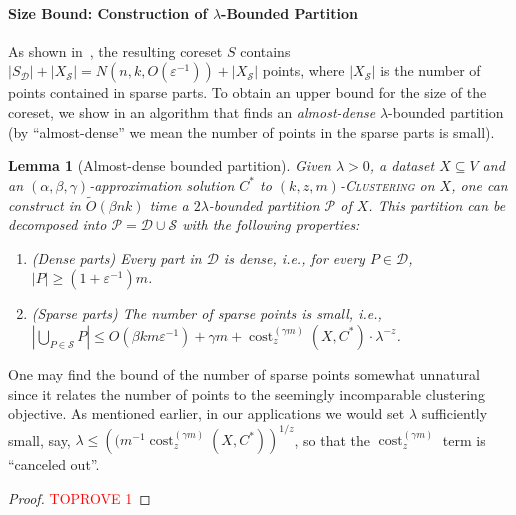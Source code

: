 \documentclass[letterpaper,11pt]{article}
\theoremstyle{plain}
\newtheorem{lemma}[theorem]{Lemma}
\theoremstyle{definition}
\theoremstyle{remark}
\DeclareMathOperator{\cost}{cost}
\newcommand{\eps}{\varepsilon}
\newcommand{\calD}{\mathcal{D}}
\newcommand{\calP}{\mathcal{P}}
\newcommand{\calS}{\mathcal{S}}
\newcommand{\ProblemName}[1]{\textsc{#1}}
\newcommand{\kzmC}{\ProblemName{$(k,z,m)$-Clustering}\xspace}
\begin{document}
\paragraph{Size Bound: Construction of $\lambda$-Bounded Partition}
As shown in~, the resulting coreset $S$ contains $|S_{\calD}| + |X_{\calS}| = N(n,k,O(\eps^{-1})) + |X_{\calS}|$ points, where $|X_{\calS}|$ is the number of points contained in sparse parts. 
To obtain an upper bound for the size of the coreset, we show in  an algorithm that finds an \emph{almost-dense} $\lambda$-bounded partition (by ``almost-dense'' we mean the number of points in the sparse parts is small).

\begin{lemma}[Almost-dense bounded partition]
    \label{lem:decomposition}
Given $\lambda>0$, a dataset $X \subseteq V$ and an $(\alpha,\beta,\gamma)$-approximation solution $C^*$ to \kzmC on $X$, one can construct in $\tilde O(\beta n k)$ time a $2\lambda$-bounded partition $\calP$ of $X$. This partition can be decomposed into $\calP = \calD \cup \calS$ with the following properties:
    \begin{enumerate}
        \item  (Dense parts) Every part in $\calD$ is dense, i.e., for every $P\in\calD$, $|P|\ge (1+\eps^{-1})m$.
        \item  (Sparse parts) The number of sparse points is small, i.e., $|\bigcup_{P\in\calS} P|\le O(\beta k m\eps^{-1}) + \gamma m + \cost_z^{(\gamma m)}(X,C^*)\cdot \lambda^{-z}$. 
    \end{enumerate}

\end{lemma}


One may find the bound of the number of sparse points somewhat unnatural since it relates the number of points to the seemingly incomparable clustering objective. As mentioned earlier, in our applications we would set $\lambda$ sufficiently small, say, $\lambda \le \left((m^{-1}\cost_z^{(\gamma m)}(X,C^*)\right)^{1/z}$, so that the $\cost_z^{(\gamma m)}$ term is ``canceled out''.





\begin{proof}\textcolor{red}{TOPROVE 1}\end{proof}
\end{document}

